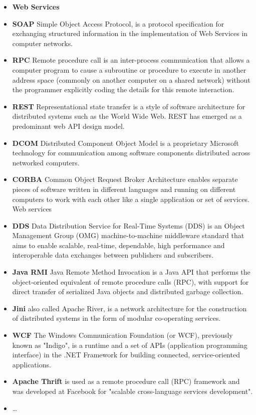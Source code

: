 \begin{itemize}
  \item \label{itm:soa_technologies} \textbf{Web Services}
  \item{\textbf{SOAP}} Simple Object Access Protocol, is a protocol specification for exchanging structured information in the implementation of Web Services in computer networks.
  \item{\textbf{RPC}} Remote procedure call is an inter-process communication that allows
  a computer program to cause a subroutine or procedure to execute in another address space (commonly on another computer on a shared network) without the programmer explicitly coding the details for this remote interaction. 
  \item{\textbf{REST}} Representational state transfer is a style of software architecture for distributed systems such as the World Wide Web. REST has emerged as a predominant web API design model.
  \item{\textbf{DCOM}} Distributed Component Object Model is a proprietary Microsoft technology for communication among software components distributed across networked computers. 
  \item{\textbf{CORBA}}  Common Object Request Broker Architecture enables separate pieces of software written in different
    languages and running on different computers to work with each other like a single application or set of services. Web services
  \item{\textbf{DDS}} Data Distribution Service for Real-Time Systems (DDS) is an Object
  Management Group (OMG) machine-to-machine middleware standard that aims to
  enable scalable, real-time, dependable, high performance and interoperable data exchanges between publishers and subscribers. 
  \item{\textbf{Java RMI}} Java Remote Method Invocation is a Java API that performs the
  object-oriented equivalent of remote procedure calls (RPC), with support for direct transfer of serialized Java objects and distributed garbage collection.
  \item{\textbf{Jini}}  also called Apache River, is a network architecture for the construction of distributed systems in the form of modular co-operating services.
  \item{\textbf{WCF}} The Windows Communication Foundation (or WCF), previously known as
  "Indigo", is a runtime and a set of APIs (application programming interface)
  in the .NET Framework for building connected, service-oriented applications.
  \item{\textbf{Apache Thrift}} is used as a remote procedure call (RPC) framework and
  was developed at Facebook for "scalable cross-language services development".
  \item \ldots
\end{itemize}

